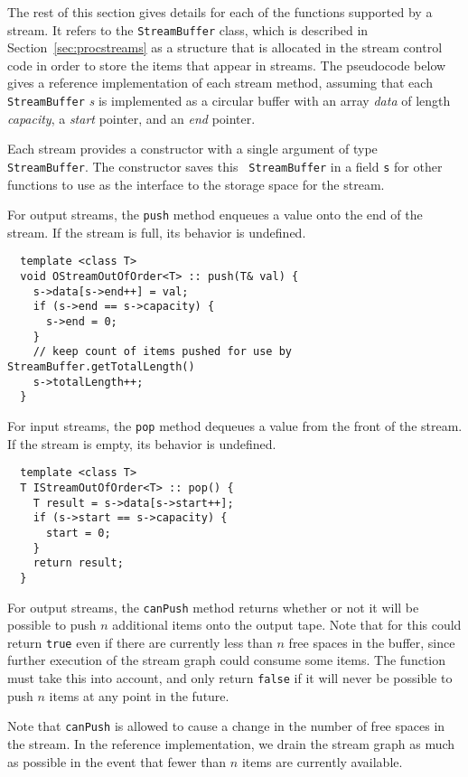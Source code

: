 The rest of this section gives details for each of the functions
supported by a stream.  It refers to the {\tt StreamBuffer} class,
which is described in Section~\ref{sec:procstreams} as a structure
that is allocated in the stream control code in order to store the
items that appear in streams.  The pseudocode below gives a reference
implementation of each stream method, assuming that each {\tt
StreamBuffer} {\it s} is implemented as a circular buffer with an
array {\it data} of length {\it capacity}, a {\it start} pointer, and
an {\it end} pointer.

 Each stream provides a constructor with a single
argument of type {\tt StreamBuffer}.  The constructor saves this {\tt
StreamBuffer} in a field {\tt s} for other functions to use as the
interface to the storage space for the stream.

 For output streams, the {\tt push} method enqueues a value
onto the end of the stream.  If the stream is full, its behavior is
undefined.

{\small
\begin{verbatim}
  template <class T>
  void OStreamOutOfOrder<T> :: push(T& val) {
    s->data[s->end++] = val;
    if (s->end == s->capacity) {
      s->end = 0;
    }
    // keep count of items pushed for use by StreamBuffer.getTotalLength()
    s->totalLength++;
  }
\end{verbatim}}

 For input streams, the {\tt pop} method dequeues a value
from the front of the stream.  If the stream is empty, its behavior is
undefined.

{\small
\begin{verbatim}
  template <class T>
  T IStreamOutOfOrder<T> :: pop() {
    T result = s->data[s->start++];
    if (s->start == s->capacity) {
      start = 0;
    }
    return result;
  }
\end{verbatim}}

 For output streams, the {\tt canPush} method returns
whether or not it will be possible to push $n$ additional items onto
the output tape.  Note that for this could return {\tt true} even if
there are currently less than $n$ free spaces in the buffer, since
further execution of the stream graph could consume some items.  The
function must take this into account, and only return {\tt false} if
it will never be possible to push $n$ items at any point in the
future.

Note that {\tt canPush} is allowed to cause a change in the number of
free spaces in the stream.  In the reference implementation, we drain
the stream graph as much as possible in the event that fewer than $n$
items are currently available.

